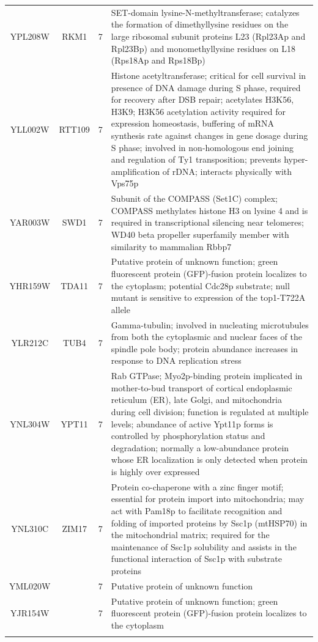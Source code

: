 \documentclass[]{article}
\begin{document}
\begin{longtable}{@{\extracolsep{3pt}} cccp{85mm}}
YPL208W & RKM1 & 7 & SET-domain lysine-N-methyltransferase; catalyzes the formation of dimethyllysine residues on the large ribosomal subunit proteins L23 (Rpl23Ap and Rpl23Bp) and monomethyllysine residues on L18 (Rps18Ap and Rps18Bp) \\ 
YLL002W & RTT109 & 7 & Histone acetyltransferase; critical for cell survival in presence of DNA damage during S phase, required for recovery after DSB repair; acetylates H3K56, H3K9; H3K56 acetylation activity required for expression homeostasis, buffering of mRNA synthesis rate against changes in gene dosage during S phase; involved in non-homologous end joining and regulation of Ty1 transposition; prevents hyper-amplification of rDNA; interacts physically with Vps75p \\ 
YAR003W & SWD1 & 7 & Subunit of the COMPASS (Set1C) complex; COMPASS methylates histone H3 on lysine 4 and is required in transcriptional silencing near telomeres; WD40 beta propeller superfamily member with similarity to mammalian Rbbp7 \\ 
YHR159W & TDA11 & 7 & Putative protein of unknown function; green fluorescent protein (GFP)-fusion protein localizes to the cytoplasm; potential Cdc28p substrate; null mutant is sensitive to expression of the top1-T722A allele \\ 
YLR212C & TUB4 & 7 & Gamma-tubulin; involved in nucleating microtubules from both the cytoplasmic and nuclear faces of the spindle pole body; protein abundance increases in response to DNA replication stress \\ 
YNL304W & YPT11 & 7 & Rab GTPase; Myo2p-binding protein implicated in mother-to-bud transport of cortical endoplasmic reticulum (ER), late Golgi, and mitochondria during cell division; function is regulated at multiple levels; abundance of active Ypt11p forms is controlled by phosphorylation status and degradation; normally a low-abundance protein whose ER localization is only detected when protein is highly over expressed \\ 
YNL310C & ZIM17 & 7 & Protein co-chaperone with a zinc finger motif; essential for protein import into mitochondria; may act with Pam18p to facilitate recognition and folding of imported proteins by Ssc1p (mtHSP70) in the mitochondrial matrix; required for the maintenance of Ssc1p solubility and assists in the functional interaction of Ssc1p with substrate proteins \\ 
YML020W &  & 7 & Putative protein of unknown function \\ 
YJR154W &  & 7 & Putative protein of unknown function; green fluorescent protein (GFP)-fusion protein localizes to the cytoplasm \\   \hline \\ [-1.8ex] 

\end{longtable}
\end{document}
